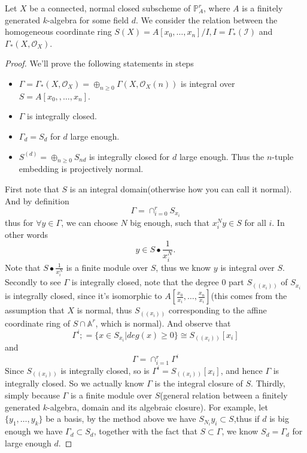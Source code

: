 \documentclass[../main.tex]{subfiles}
\begin{document}
\begin{example}
Let $X$ be a connected, normal closed subscheme of $\mathbb{P}_{A}^{r}$, where $A$ is a finitely generated $k$-algebra for some field $d$. We consider the relation between the homogeneous coordinate ring $S(X)=A[x_{0},\dots, x_{n}]/I, I=\Gamma_{*}(\mathscr{I})$ and $\Gamma_{*}(X,\mathcal{O}_{X})$.  
\begin{proof}
We'll prove the following statements in steps
\begin{itemize}
\item $\Gamma=\Gamma_{*}(X,\mathcal{O}_{X})=\oplus_{n\geq 0}\Gamma(X,\mathcal{O}_{X}(n))$ is integral over $S=A[x_{0},,\dots, x_{n}]$.
\item $\Gamma$ is integrally closed.
\item $\Gamma_{d}=S_{d}$ for $d$ large enough.
\item $S^{(d)}=\oplus_{n\geq 0}S_{nd}$ is integrally closed for $d$ large enough. Thus the $n$-tuple embedding is projectively normal.
\end{itemize}
First note that $S$ is an integral domain(otherwise how you can call it normal). And by definition 
$$\Gamma=\cap_{i=0}^{r}S_{x_{i}}$$
thus for $\forall y\in \Gamma$, we can choose $N$ big enough, such that $x_{i}^{N}y\in S$ for all $i$. In other words
$$y\in S\bullet \frac{1}{x_{i}^{N}}.$$
Note that $S\bullet\frac{1}{x_{i}^{N}}$ is a finite module over $S$, thus we know $y$ is integral over $S$. 
Secondly to see $\Gamma$ is integrally closed, note that the degree $0$ part $S_{((x_{i}))}$ of $S_{x_{i}}$ is integrally closed, since it's isomorphic to $A[\frac{x_{0}}{x_{i}},\dots, \frac{x_{n}}{x_{i}}]$(this comes from the assumption that $X$ is normal, thus $S_{((x_{i}))}$ corresponding to the affine coordinate ring of $S\cap \mathbb{A}^{r}$, which is normal). And observe that 
$$\Gamma^{i};=\{x\in S_{x_{i}}|deg(x)\geq 0\}\cong S_{((x_{i}))}[x_{i}]$$
and 
$$\Gamma=\cap_{i=1}^{r}\Gamma^{i}$$
Since $S_{((x_{i}))}$ is integrally closed, so is $\Gamma^{i}=S_{((x_{i}))}[x_{i}]$, and hence $\Gamma$ is integrally closed. So we actually know $\Gamma$ is the integral closure of $S$.
Thirdly, simply because $\Gamma$ is a finite module over $S$(general relation between a finitely generated $k$-algebra, domain and its algebraic closure). For example, let $\{y_{1},\dots, y_{k}\}$ be a basis, by the method above we have $S_{N_{i}}y_{i}\subset S$,thus if $d$ is big enough we have $\Gamma_{d}\subset S_{d}$, together with the fact that $S\subset \Gamma$, we know $S_{d}=\Gamma_{d}$ for large enough $d$. 


\end{proof}
\end{example}
\end{document}
